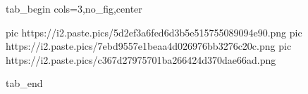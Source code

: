 
 
 
 
 


\ifcmt
  tab_begin cols=3,no_fig,center

     pic https://i2.paste.pics/5d2ef3a6fed6d3b5e515755089094e90.png
		 pic https://i2.paste.pics/7ebd9557e1beaa4d026976bb3276c20c.png
		 pic https://i2.paste.pics/c367d27975701ba266424d370dae66ad.png

  tab_end
\fi
